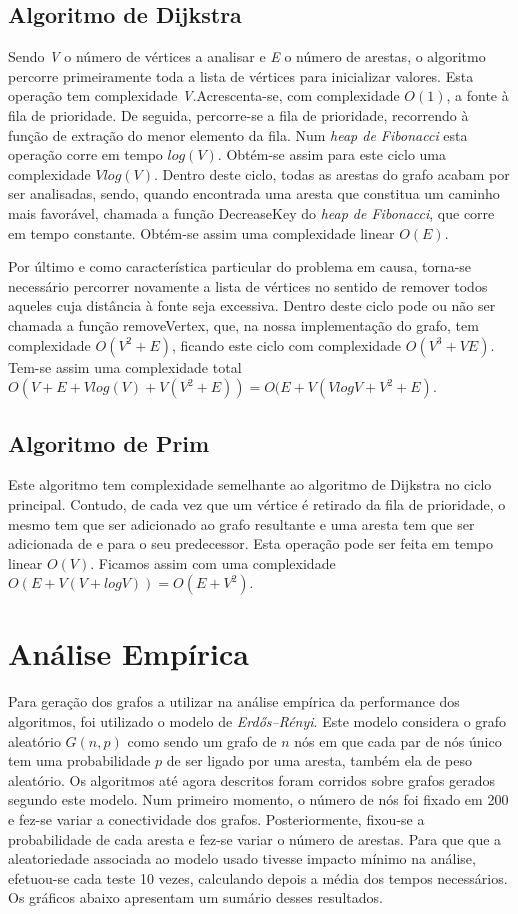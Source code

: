 \documentclass[a4paper,12pt,titlepage]{article}
\begin{document}
\subsection{Algoritmo de Dijkstra}
Sendo \emph{V} o número de vértices a analisar e \emph{E} o número de arestas, o algoritmo percorre primeiramente toda a lista de vértices para inicializar valores. Esta operação tem complexidade \emph{V}.Acrescenta-se, com complexidade $O(1)$, a fonte à fila de prioridade. De seguida, percorre-se a fila de prioridade, recorrendo à função de extração do menor elemento da fila. Num \emph{heap de Fibonacci} esta operação corre em tempo $log(V)$. Obtém-se assim para este ciclo uma complexidade $Vlog(V)$. Dentro deste ciclo, todas as arestas do grafo acabam por ser analisadas, sendo, quando encontrada uma aresta que constitua um caminho mais favorável, chamada a função DecreaseKey do \emph{heap de Fibonacci}, que corre em tempo constante. Obtém-se assim uma complexidade linear $O(E)$.

Por último e como característica particular do problema em causa, torna-se necessário percorrer novamente a lista de vértices no sentido de remover todos aqueles cuja distância à fonte seja excessiva. Dentro deste ciclo pode ou não ser chamada a função removeVertex, que, na nossa implementação do grafo, tem complexidade $O(V^2+ E)$, ficando este ciclo com complexidade $O(V^3+VE)$. Tem-se assim uma complexidade total $O(V+E+Vlog(V)+V(V^2+E)) = O(E+V(VlogV+V^2+E)$.

\subsection{Algoritmo de Prim}
Este algoritmo tem complexidade semelhante ao algoritmo de Dijkstra no ciclo principal. Contudo, de cada vez que um vértice é retirado da fila de prioridade, o mesmo tem que ser adicionado ao grafo resultante e uma aresta tem que ser adicionada de e para o seu predecessor. Esta operação pode ser feita em tempo linear $O(V)$. Ficamos assim com uma complexidade $O(E+V(V+ logV))=O(E+V^2)$.

\section{Análise Empírica}
Para geração dos grafos a utilizar na análise empírica da performance dos algoritmos, foi utilizado o modelo de \emph{Erdős–Rényi}. Este modelo considera o grafo aleatório $G(n,p)$ como sendo um grafo de $n$ nós em que cada par de nós único tem uma probabilidade $p$ de ser ligado por uma aresta, também ela de peso aleatório. Os algoritmos até agora descritos foram corridos sobre grafos gerados segundo este modelo. Num primeiro momento, o número de nós foi fixado em 200 e fez-se variar a conectividade dos grafos. Posteriormente, fixou-se a probabilidade de cada aresta e fez-se variar o número de arestas. Para que que a aleatoriedade associada ao modelo usado tivesse impacto mínimo na análise, efetuou-se cada teste 10 vezes, calculando depois a média dos tempos necessários. Os gráficos abaixo apresentam um sumário desses resultados.
\newpage
\end{document}
